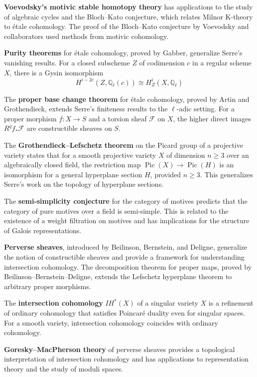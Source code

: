 \textbf{Voevodsky's motivic stable homotopy theory} has applications to the study of algebraic cycles and the Bloch--Kato conjecture, which relates Milnor K-theory to étale cohomology. The proof of the Bloch--Kato conjecture by Voevodsky and collaborators used methods from motivic cohomology.

\textbf{Purity theorems} for étale cohomology, proved by Gabber, generalize Serre's vanishing results. For a closed subscheme $Z$ of codimension $c$ in a regular scheme $X$, there is a Gysin isomorphism
\[H^{i-2c}(Z, \mathbb{Q}_\ell(c)) \cong H^i_Z(X, \mathbb{Q}_\ell)\]

The \textbf{proper base change theorem} for étale cohomology, proved by Artin and Grothendieck, extends Serre's finiteness results to the $\ell$-adic setting. For a proper morphism $f: X \to S$ and a torsion sheaf $\mathcal{F}$ on $X$, the higher direct images $R^q f_* \mathcal{F}$ are constructible sheaves on $S$.

The \textbf{Grothendieck--Lefschetz theorem} on the Picard group of a projective variety states that for a smooth projective variety $X$ of dimension $n \geq 3$ over an algebraically closed field, the restriction map $\operatorname{Pic}(X) \to \operatorname{Pic}(H)$ is an isomorphism for a general hyperplane section $H$, provided $n \geq 3$. This generalizes Serre's work on the topology of hyperplane sections.

The \textbf{semi-simplicity conjecture} for the category of motives predicts that the category of pure motives over a field is semi-simple. This is related to the existence of a weight filtration on motives and has implications for the structure of Galois representations.

\textbf{Perverse sheaves}, introduced by Beilinson, Bernstein, and Deligne, generalize the notion of constructible sheaves and provide a framework for understanding intersection cohomology. The decomposition theorem for proper maps, proved by Beilinson--Bernstein--Deligne, extends the Lefschetz hyperplane theorem to arbitrary proper morphisms.

The \textbf{intersection cohomology} $IH^*(X)$ of a singular variety $X$ is a refinement of ordinary cohomology that satisfies Poincaré duality even for singular spaces. For a smooth variety, intersection cohomology coincides with ordinary cohomology.

\textbf{Goresky--MacPherson theory} of perverse sheaves provides a topological interpretation of intersection cohomology and has applications to representation theory and the study of moduli spaces.

